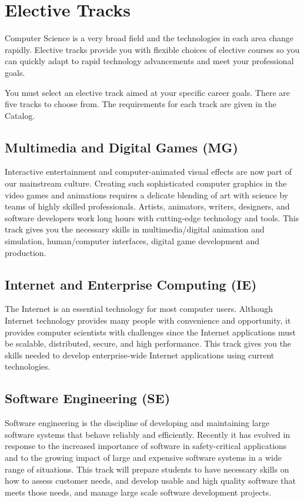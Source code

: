 \documentclass{book}
\begin{document}
\section{Elective Tracks}
 
Computer Science is a very broad field and the technologies in each area change rapidly. Elective tracks provide you with flexible choices of elective courses so you can quickly adapt to rapid technology advancements and meet your professional goals.

You must select an elective track aimed at your specific career goals. There are five tracks to choose from. The requirements for each track are given in the Catalog.

\subsection{Multimedia and Digital Games (MG)}
Interactive entertainment and computer-animated visual effects are now part of our mainstream culture. Creating such sophisticated computer graphics in the video games and animations requires a delicate blending of art with science by teams of highly skilled professionals. Artists, animators, writers, designers, and software developers work long hours with cutting-edge technology and tools. This track gives you the necessary skills in multimedia/digital animation and simulation, human/computer interfaces, digital game development and production.

\subsection{Internet and Enterprise Computing (IE)}
The Internet is an essential technology for most computer users. Although Internet technology provides many people with convenience and opportunity, it provides computer scientists with challenges since the Internet applications must be scalable, distributed, secure, and high performance. This track gives you the skills needed to develop enterprise-wide Internet applications using current technologies.

\subsection{Software Engineering (SE)}
Software engineering is the discipline of developing and maintaining large software systems that behave reliably and efficiently. Recently it has evolved in response to the increased importance of software in safety-critical applications and to the growing impact of large and expensive software systems in a wide range of situations. This track will prepare students to have necessary skills on how to assess customer needs, and develop usable and high quality software that meets those needs, and manage large scale software development projects.
\end{document}
